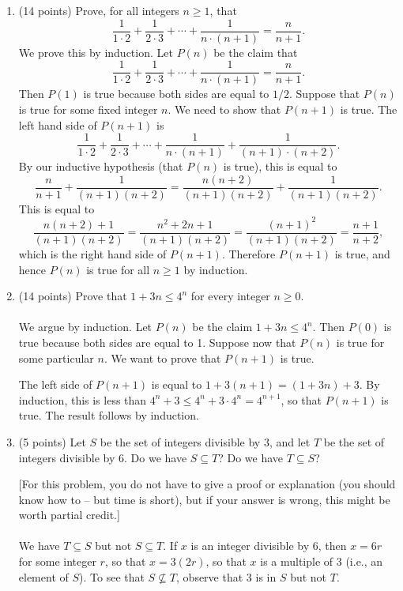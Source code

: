 \documentclass[12pt]{article}
\begin{document}
\begin{enumerate}[1.]
\item (14 points)
Prove, for all integers $n \geq 1$, that
$$
\frac{1}{1 \cdot 2} + 
\frac{1}{2 \cdot 3} + 
\cdots + 
\frac{1}{n \cdot (n + 1)} 
= \frac{n}{n + 1}.
$$
We prove this by induction. Let $P(n)$ be the claim that
$$
\frac{1}{1 \cdot 2} + 
\frac{1}{2 \cdot 3} + 
\cdots + 
\frac{1}{n \cdot (n + 1)} 
= \frac{n}{n + 1}.
$$
Then $P(1)$ is true because both sides are equal to $1/2$. Suppose that $P(n)$ is true for some fixed integer $n$. We need to 
show that $P(n + 1)$ is true. The left hand side of $P(n + 1)$ is
$$
\frac{1}{1 \cdot 2} + 
\frac{1}{2 \cdot 3} + 
\cdots + 
\frac{1}{n \cdot (n + 1)} 
+ \frac{1}{(n + 1) \cdot (n + 2)}.$$
By our inductive hypothesis (that $P(n)$ is true), this is equal to
$$
\frac{n}{n + 1} + \frac{1}{(n + 1)(n + 2)} = \frac{n(n +2)}{(n + 1)(n + 2)} 
+ \frac{1}{(n + 1)(n + 2)}.$$
This is equal to 
$$\frac{n (n + 2) + 1}{(n + 1)(n + 2)} = 
\frac{n^2 + 2n + 1}{(n + 1)(n + 2)} = 
\frac{(n + 1)^2}{(n + 1)(n + 2)} = \frac{n + 1}{n + 2},$$
which is the right hand side of $P(n + 1)$. Therefore $P(n + 1)$ is true, and hence $P(n)$ is true for all $n \geq 1$ by induction.

\item (14 points)
Prove that $1 + 3n \leq 4^n$ for every integer $n \geq 0$.
\\
\\
We argue by induction. Let $P(n)$ be the claim $1 + 3n \leq 4^n$. Then $P(0)$ is true because both sides are equal to 1.
Suppose now that $P(n)$ is true for some particular $n$. We want to prove that $P(n + 1)$ is true.

The left side of $P(n + 1)$ is equal to $1 + 3(n + 1) = (1 + 3n) + 3.$ By induction, this is less than $4^n + 3 \leq 4^n + 3 \cdot 4^n = 4^{n + 1}$,
so that $P(n + 1)$ is true. The result follows by induction.

\item (5 points)
Let $S$ be the set of integers divisible by $3$, and let $T$ be the set of integers divisible by $6$. Do we have
$S \subseteq T$? Do we have $T \subseteq S$?

[For this problem, you do not have to give a proof or explanation (you should know how to -- but time is short), but if your answer
is wrong, this might be worth partial credit.]
\\
\\
We have $T \subseteq S$ but not $S \subseteq T$. If $x$ is an integer divisible by 6, then $x = 6r$ for some integer $r$, so that
$x = 3(2r)$, so that $x$ is a multiple of $3$ (i.e., an element of $S$). To see that $S \not \subseteq T$, observe that $3$ is in $S$
but not $T$.

\end{enumerate}
\end{document}
